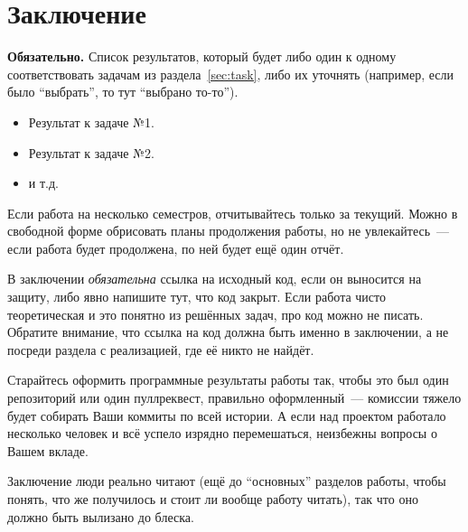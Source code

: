 
\section*{Заключение}
\textbf{Обязательно.}
Список результатов, который будет либо один к одному соответствовать задачам из раздела~\ref{sec:task}, либо их уточнять (например, если было \enquote{выбрать}, то тут \enquote{выбрано то-то}).

\begin{itemize}
    \item Результат к задаче №1.
    \item Результат к задаче №2.
    \item и т.д.
\end{itemize}
\noindent Если работа на несколько семестров, отчитывайтесь только за текущий.
Можно в свободной форме обрисовать планы продолжения работы, но не увлекайтесь~--- если работа будет продолжена, по ней будет ещё один отчёт.

В заключении \emph{обязательна} ссылка на исходный код, если он выносится на защиту, либо явно напишите тут, что код закрыт.
Если работа чисто теоретическая и это понятно из решённых задач, про код можно не писать.
Обратите внимание, что ссылка на код должна быть именно в заключении, а не посреди раздела с реализацией, где её никто не найдёт.

Старайтесь оформить программные результаты работы так, чтобы это был один репозиторий или один пуллреквест, правильно оформленный~--- комиссии тяжело будет собирать Ваши коммиты по всей истории.
А если над проектом работало несколько человек и всё успело изрядно перемешаться, неизбежны вопросы о Вашем вкладе.

Заключение люди реально читают (ещё до \enquote{основных} разделов работы, чтобы понять, что же получилось и стоит ли вообще работу читать), так что оно должно быть вылизано до блеска.
